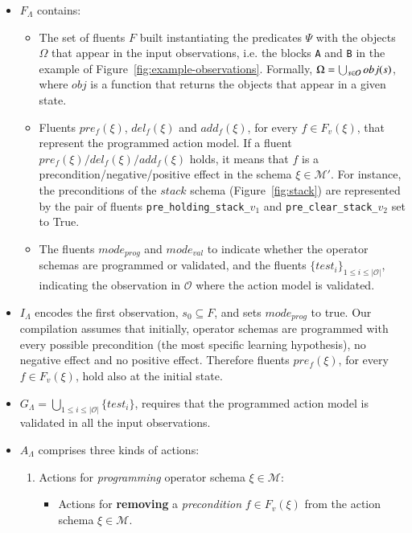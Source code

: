 \documentclass[3p,times]{elsarticle}
\begin{document}
\begin{itemize}
\item $F_{\Lambda}$ contains:
\begin{itemize}
\item The set of fluents $F$ built instantiating the predicates $\Psi$ with the objects $\Omega$ that appear in the input observations, i.e. the blocks {\tt\small A} and {\tt\small B} in the example of Figure~\ref{fig:example-observations}. Formally, $\Omega=\bigcup_{\small s\in\mathcal{O}} obj(s)$, where $obj$ is a function that returns the objects that appear in a given state.
\item Fluents $pre_f(\xi)$, $del_f(\xi)$ and $add_f(\xi)$, for every $f\in F_v(\xi)$, that represent the programmed action model. If a fluent $pre_f(\xi)/del_f(\xi)/add_f(\xi)$ holds, it means that $f$ is a precondition/negative/positive effect in the schema $\xi\in \mathcal{M}'$. For instance, the preconditions of the $stack$ schema (Figure~\ref{fig:stack}) are represented by the pair of fluents {\small\tt pre\_holding\_stack\_$v_1$} and {\small\tt pre\_clear\_stack\_$v_2$} set to True.
\item The fluents $mode_{prog}$ and $mode_{val}$ to indicate whether the operator schemas are programmed or validated, and the fluents $\{test_i\}_{1\leq i\leq |\mathcal{O}|}$, indicating the observation in $\mathcal{O}$ where the action model is validated.
\end{itemize}
\item $I_{\Lambda}$ encodes the first observation, $s_0\subseteq F$, and sets $mode_{prog}$ to true. Our compilation assumes that initially, operator schemas are programmed with every possible precondition (the most specific learning hypothesis), no negative effect and no positive effect. Therefore fluents $pre_f(\xi)$, for every $f\in F_v(\xi)$, hold also at the initial state.

\item $G_{\Lambda}=\bigcup_{1\leq i\leq |\mathcal{O}|}\{test_i\}$, requires that the programmed action model is validated in all the input observations.
\item $A_{\Lambda}$ comprises three kinds of actions:
\begin{enumerate}
\item Actions for {\em programming} operator schema $\xi\in\mathcal{M}$:
\begin{itemize}
\item Actions for {\bf removing} a {\em precondition} $f\in F_v(\xi)$ from the action schema $\xi\in\mathcal{M}$.


\end{itemize}
\end{enumerate}
\end{itemize}
\end{document}

